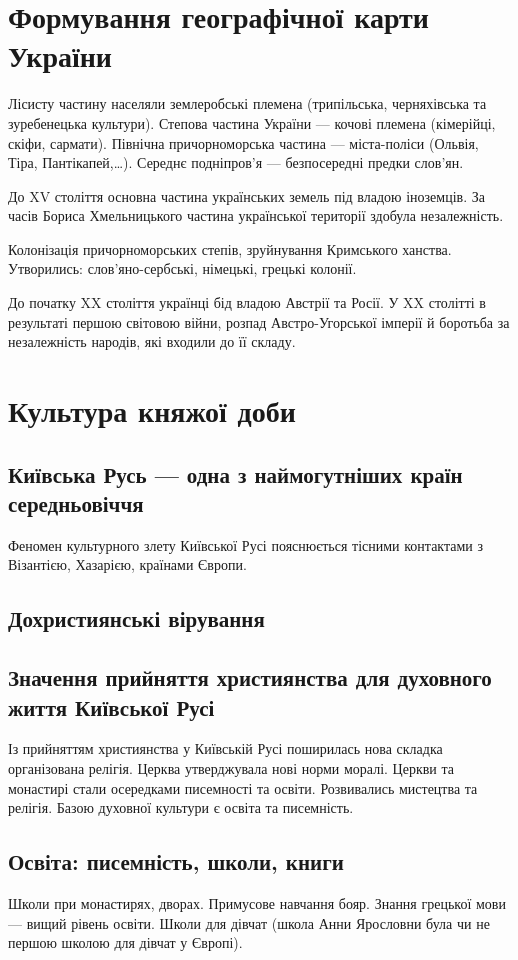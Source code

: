 \documentclass[a5paper,10pt,titlepage,pdftex,headsepline]{scrartcl}
\begin{document}
\section{Формування географічної карти України}
Лісисту частину населяли землеробські племена (трипільська, черняхівська та зуребенецька культури).
Степова частина України --- кочові племена (кімерійці, скіфи, сармати).
Північна причорноморська частина --- міста-поліси (Ольвія, Тіра, Пантікапей,\dots).
Середнє подніпров’я --- безпосередні предки слов’ян.

До XV століття основна частина українських земель під владою іноземців.
За часів Бориса Хмельницького частина української території здобула незалежність.

Колонізація причорноморських степів, зруйнування Кримського ханства.
Утворились: слов’яно-сербські, німецькі, грецькі колонії.

До початку XX століття українці бід владою Австрії та Росії.
У XX столітті в результаті першою світовою війни,
розпад Австро-Угорської імперії й боротьба за незалежність народів, які входили до її складу.
\section{Культура княжої доби}
\subsection{Київська Русь --- одна з наймогутніших країн середньовіччя}
Феномен культурного злету Київської Русі пояснюється тісними контактами з Візантією, Хазарією, країнами Європи.
\subsection{Дохристиянські вірування}
\subsection{Значення прийняття християнства для духовного життя Київської Русі}
Із прийняттям християнства у Київській Русі поширилась нова складка організована релігія.
Церква утверджувала нові норми моралі.
Церкви та монастирі стали осередками писемності та освіти.
Розвивались мистецтва та релігія.
Базою духовної культури є освіта та писемність.
\subsection{Освіта: писемність, школи, книги}
Школи при монастирях, дворах.
Примусове навчання бояр.
Знання грецької мови --- вищий рівень освіти.
Школи для дівчат (школа Анни Ярословни була чи не першою школою для дівчат у Європі).
\end{document}

